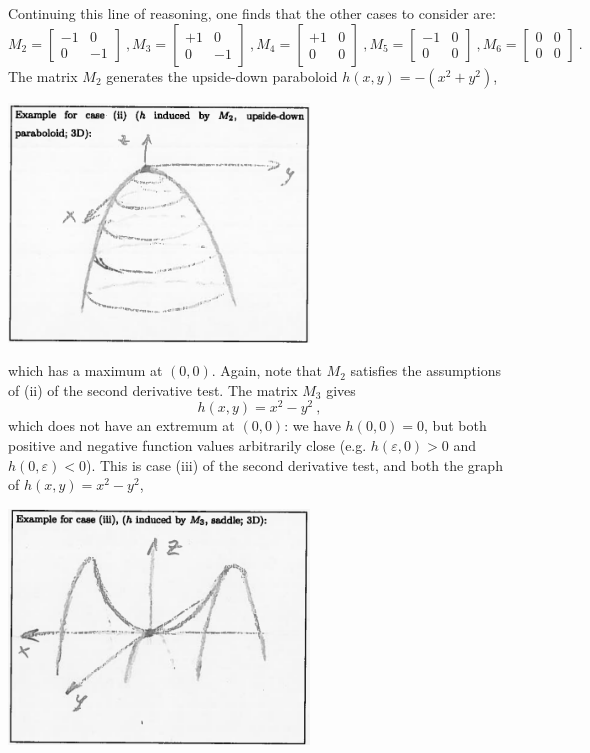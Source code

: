 \begin{remark}
Continuing this line of reasoning, one finds that the other cases to consider are:
\begin{equation*}
M_2 = \begin{bmatrix} -1 & 0 \\ 0 & -1 \end{bmatrix} \:,
M_3 = \begin{bmatrix} +1 & 0 \\ 0 & -1 \end{bmatrix} \:,
M_4 = \begin{bmatrix} +1 & 0 \\ 0 & 0 \end{bmatrix} \:, 
M_5 = \begin{bmatrix} -1 & 0 \\ 0 & 0 \end{bmatrix} \:, 
M_6 = \begin{bmatrix} 0 & 0 \\ 0 & 0 \end{bmatrix} \:.
\end{equation*}
The matrix $M_2$ generates the upside-down paraboloid $h(x,y)=-(x^2+y^2)$,
\begin{center}
	\includegraphics[width=0.6\textwidth]{./Figures/f308.png}
\end{center}
which has a maximum at $(0,0)$. Again, note that $M_2$ satisfies the assumptions of (ii) of the second derivative test. The matrix $M_3$ gives
\[ h(x,y) = x^2-y^2 \:, \]
which does not have an extremum at $(0,0)$: we have $h(0,0)=0$, but both positive and negative function values arbitrarily close (e.g. $h(\varepsilon,0)>0$ and $h(0,\varepsilon)<0$). This is case (iii) of the second derivative test, and both the graph of $h(x,y) = x^2-y^2$,
\begin{center}
	\includegraphics[width=0.6\textwidth]{./Figures/f309.png}

\end{center}
\end{remark}
